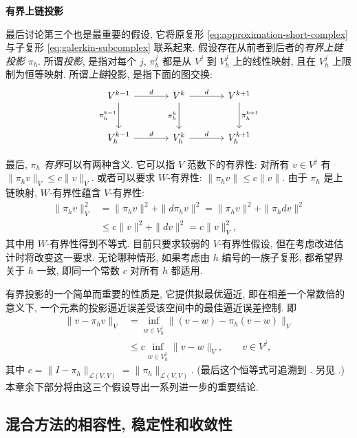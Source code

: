 \medskip\noindent\textbf{{有界上链投影}}\par
{最后讨论第三个也是最重要的假设, 它将原复形 \eqref{eq:approximation-short-complex} 与子复形 \eqref{eq:galerkin-subcomplex} 联系起来. 假设存在从前者到后者的\emph{有界上链投影} $\pi_h$. 所谓\emph{投影}, 是指对每个 $j$, $\pi_h^j$ 都是从 $V^j$ 到 $V_h^j$ 上的线性映射, 且在 $V_h^j$ 上限制为恒等映射. 所谓\emph{上链}投影, 是指下面的图交换:}
\[
\begin{tikzcd}[column sep=large,row sep=large]
V^{k-1}\arrow[r,"d"]\arrow[d,"\pi_h^{k-1}"']&V^k\arrow[r,"d"]\arrow[d,"\pi_h^k"']&V^{k+1}\arrow[d,"\pi_h^{k+1}"]\\
V_h^{k-1}\arrow[r,"d"]&V_h^k\arrow[r,"d"]&V_h^{k+1}
\end{tikzcd}
\]

{最后, $\pi_h$ \emph{有界}可以有两种含义. 它可以指 $V$ 范数下的有界性: 对所有 $v\in V^j$ 有 $\|\pi_hv\|_V\leq c\|v\|_V$. 或者可以要求 $W$-有界性: $\|\pi_hv\|\leq c\|v\|$. 由于 $\pi_h$ 是上链映射, $W$-有界性蕴含 $V$-有界性:}
\[
\begin{aligned}
\|\pi_hv\|_V^2&=\|\pi_hv\|^2+\|d\pi_hv\|^2=\|\pi_hv\|^2+\|\pi_hdv\|^2\\
&\leq c\|v\|^2+\|dv\|^2=c\|v\|_V^2,
\end{aligned}
\]
{其中用 $W$-有界性得到不等式. 目前只要求较弱的 $V$-有界性假设, 但在考虑改进估计时将改变这一要求. 无论哪种情形, 如果考虑由 $h$ 编号的一族子复形, 都希望界关于 $h$ 一致, 即同一个常数 $c$ 对所有 $h$ 都适用.}

{有界投影的一个简单而重要的性质是, 它提供拟最优逼近, 即在相差一个常数倍的意义下, 一个元素的投影逼近误差受该空间中的最佳逼近误差控制. 即}
\begin{equation}\label{eq:projection-quasioptimality}
\begin{aligned}
\|v-\pi_hv\|_V&=\inf_{w\in V_h^j}\|(v-w)-\pi_h(v-w)\|_V\\
&\leq c\inf_{w\in V_h^j}\|v-w\|_V,\qquad v\in V^j,
\end{aligned}
\end{equation}
{其中 $c=\|I-\pi_h\|_{\mathcal L(V,V)}=\|\pi_h\|_{\mathcal L(V,V)}$. (最后这个恒等式可追溯到 . 另见 .) 本章余下部分将由这三个假设导出一系列进一步的重要结论.}

\subsection{{混合方法的相容性, 稳定性和收敛性}}\label{subsec:mixed-consistency-stability}

